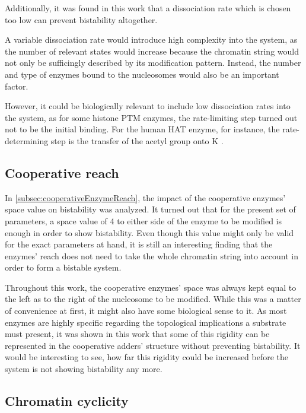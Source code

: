             Additionally, it was found in this work that a dissociation rate which is chosen too low can prevent bistability altogether.

            A variable dissociation rate would introduce high complexity into the system, as the number of relevant states would increase because the chromatin string would not only be sufficingly described by its modification pattern. Instead, the number and type of enzymes bound to the nucleosomes would also be an important factor.

            However, it could be biologically relevant to include low dissociation rates into the system, as for some histone PTM enzymes, the rate-limiting step turned out not to be the initial binding. For the human HAT enzyme, for instance, the rate-determining step is the transfer of the acetyl group onto K \cite{Tanner2000HATKinetics}.
        \subsection*{Cooperative reach}

            In \ref{subsec:cooperativeEnzymeReach}, the impact of the cooperative enzymes' space value on bistability was analyzed. It turned out that for the present set of parameters, a space value of 4 to either side of the enzyme to be modified is enough in order to show bistability. Even though this value might only be valid for the exact parameters at hand, it is still an interesting finding that the enzymes' reach does not need to take the whole chromatin string into account in order to form a bistable system.

            Throughout this work, the cooperative enzymes' space was always kept equal to the left as to the right of the nucleosome to be modified. While this was a matter of convenience at first, it might also have some biological sense to it. As most enzymes are highly specific regarding the topological implications a substrate must present, it was shown in this work that some of this rigidity can be represented in the cooperative adders' structure without preventing bistability. It would be interesting to see, how far this rigidity could be increased before the system is not showing bistability any more.

        \subsection*{Chromatin cyclicity}

